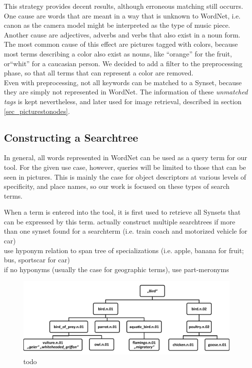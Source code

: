 This strategy provides decent results, although erroneous matching still occurrs. One cause are words that are meant in a way that is unknown to WordNet, i.e. canon as the camera model might be interpreted as the type of music piece. Another cause are adjectives, adverbs and verbs that also exist in a noun form. The most common cause of this effect are pictures tagged with colors, because most terms describing a color also exist as nouns, like ``orange'' for the fruit, or``whit'' for a caucasian person. We decided to add a filter to the preprocessing phase, so that all terms that can represent a color are removed. \\

Even with preprocessing, not all keywords can be matched to a Synset, because they are simply not represented in WordNet. The information of these \emph{unmatched tags} is kept nevertheless, and later used for image retrieval, described in section \ref{sec_picturestonodes}.


\subsection{Constructing a Searchtree} 
\label{sec_searchtreeconstruction}
In general, all words represented in WordNet can be used as a query term for our tool. For the given use case, however, queries will be limited to those that can be seen in pictures. This is mainly the case for object descriptors at various levels of specificity, and place names, so our work is focused on these types of search terms.

When a term is entered into the tool, it is first used to retrieve all Synsets that can be expressed by this term.
actually construct multiple searchtrees if more than one synset found for a searchterm (i.e. train coach and motorized vehicle for car)\\
use hyponym relation to span tree of specializations (i.e. apple, banana for fruit; bus, sportscar for car)\\
if no hyponyms (usually the case for geographic terms), use part-meronyms\\

\begin{figure}
\includegraphics[width=\textwidth]{images/searchtree.pdf}
\caption{todo}
\label{fig_searchtree}
\end{figure}


